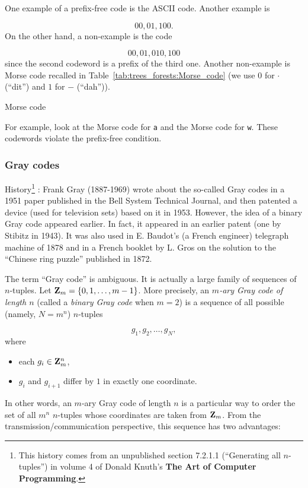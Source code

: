 One example of a prefix-free code is the ASCII code.
Another example is

\[
00, 01, 100.
\]
On the other hand, a non-example is the code

\[
00, 01, 010, 100
\]
since the second codeword is a prefix of the third one.
Another non-example is Morse code recalled in
Table~\ref{tab:trees_forests:Morse_code} (we use $0$ for
$\cdot$ (``dit'') and $1$ for $-$ (``dah'')).

\begin{table}[!htbp]
\centering

\caption{Morse code}
\label{tab:trees_forests:Morse_code}
\end{table}

For example, look at the Morse code for {\tt a} and the Morse code for
{\tt w}. These codewords violate the prefix-free condition.

\subsubsection{Gray codes}

History\footnote{This
history comes from an unpublished section 7.2.1.1
(``Generating all $n$-tuples'')
in volume 4 of Donald Knuth's {\bf The Art of Computer Programming}.
}
: Frank Gray (1887-1969) wrote about the so-called Gray codes in a
1951 paper published in the Bell System Technical Journal,
and then patented a device (used for television sets)
based on it in 1953. However, the idea of a binary Gray code
appeared earlier. In fact, it appeared in an earlier patent
(one by Stibitz in 1943). It was also used in E. Baudot's
(a French engineer) telegraph machine of 1878 and in
a French booklet by L. Gros on the solution to the
``Chinese ring puzzle'' published in 1872.

The term ``Gray code'' is ambiguous. It is actually a
large family of sequences of $n$-tuples. Let
$\mathbf{Z}_m=\{0,1,\dots,m-1\}$. More precisely, an
{\it $m$-ary Gray code of length $n$} (called a {\it binary
Gray code} when $m=2$) is a sequence of
all possible (namely, $N=m^n$) $n$-tuples

\[
g_1,g_2,\dots, g_N,
\]
where
\begin{itemize}
\item
each $g_i\in \mathbf{Z}_m^n$,
\item
$g_i$ and $g_{i+1}$ differ by $1$ in exactly one
coordinate.
\end{itemize}
In other words, an $m$-ary Gray code of length
$n$ is a particular way to order the set of all
$m^n$ $n$-tuples whose coordinates are taken from
$\mathbf{Z}_m$. From the transmission/communication
perspective, this sequence has two advantages:

